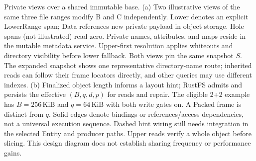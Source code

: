 \caption{Private views over a shared immutable base.
(a) Two illustrative views of the same three file ranges modify B and C
independently. Lower denotes an explicit LowerRange span; Data references
new private payload in object storage. Hole spans (not illustrated) read zero. Private names,
attributes, and maps reside in the mutable metadata service. Upper-first
resolution applies whiteouts and directory visibility before lower fallback.
Both views pin the same snapshot $S$. The expanded snapshot shows one
representative directory-name route; inherited reads can follow their frame
locators directly, and other queries may use different indexes.
(b) Finalized object length informs a layout hint; RustFS admits and persists
the effective $(B,q,d,p)$ for reads and repair. The eligible 2+2 example has
$B=256\,\mathrm{KiB}$ and $q=64\,\mathrm{KiB}$ with both write gates on.
A Packed frame is distinct from $q$. Solid edges denote bindings or
references/access dependencies, not a universal execution sequence.
Dashed hint wiring still needs integration in the selected Entity and producer
paths. Upper reads verify a whole object before slicing. This design diagram
does not establish sharing frequency or performance gains.}
